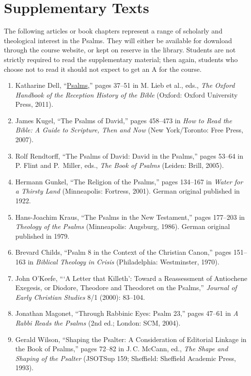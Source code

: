 \documentclass[titlepage]{article}
\begin{document}
\section{Supplementary Texts}
\label{supplementary}

The following articles or book chapters represent a range of scholarly
and theological interest in the Psalms. They will either be available
for download through the course website, or kept on reserve in the
library. Students are not strictly required to read the supplementary
material; then again, students who choose not to read it should not
expect to get an A for the course.

\begin{enumerate}
 \item Katharine Dell, “\href{http://ezproxy.mytyndale.ca:2048/login?url=http://www.oxfordhandbooks.com/view/10.1093/oxfordhb/9780199204540.001.0001/oxfordhb-9780199204540-e-4}{Psalms},” pages 37--51 in M. Lieb et al., eds., \emph{The Oxford Handbook of the Reception History of the Bible} (Oxford: Oxford University Press, 2011).
 \item James Kugel, “The Psalms of David,” pages 458–473 in \emph{How to Read the Bible: A Guide to Scripture, Then and Now} (New York/Toronto: Free Press, 2007).
 \item Rolf Rendtorff, “The Psalms of David: David in the Psalms,” pages 53–64 in P. Flint and P.~Miller, eds., \emph{The Book of Psalms} (Leiden: Brill, 2005).
 \item Hermann Gunkel, “The Religion of the Psalms,” pages 134–167 in \emph{Water for a Thirsty Land} (Minneapolis: Fortress, 2001). German original published in 1922.
 \item Hans-Joachim Kraus, “The Psalms in the New Testament,” pages 177–203 in \emph{Theology of the Psalms} (Minneapolis: Augsburg, 1986). German original published in 1979.
 \item Brevard Childs, “Psalm 8 in the Context of the Christian Canon,” pages 151–163 in \emph{Biblical Theology in Crisis} (Philadelphia: Westminster, 1970).
 \item John O’Keefe, “‘A Letter that Killeth’: Toward a Reassessment of Antiochene Exegesis, or Diodore, Theodore and Theodoret on the Psalms,” \emph{Journal of Early Christian Studies} 8/1 (2000): 83–104.
 \item Jonathan Magonet, “Through Rabbinic Eyes: Psalm 23,” pages 47–61 in \emph{A Rabbi Reads the Psalms} (2nd ed.; London: SCM, 2004).
 \item Gerald Wilson, “Shaping the Psalter: A Consideration of Editorial Linkage in the Book of Psalms,” pages 72–82 in J.\,C. McCann, ed., \emph{The Shape and Shaping of the Psalter} (JSOTSup 159; Sheffield: Sheffield Academic Press, 1993).

\end{enumerate}
\end{document}
